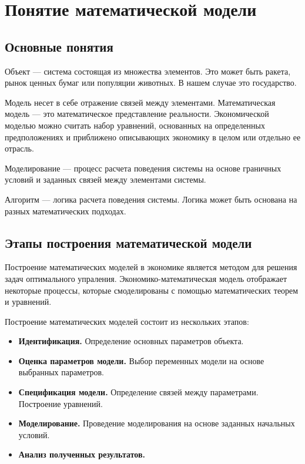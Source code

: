 \chapter{Понятие математической модели}
\label{cha:definition}

\section{Основные понятия}

Объект --- система состоящая из множества элементов.
Это может быть ракета, рынок ценных бумаг или популяции животных.
В нашем случае это государство.

Модель несет в себе отражение связей между элементами.
Математическая модель --- это математическое представление реальности.
Экономической моделью можно считать набор уравнений, основанных на определенных предположениях и приближено описывающих экономику в целом или отдельно ее отрасль.

Моделирование --- процесс расчета поведения системы на основе граничных условий и заданных связей между элементами системы.

Алгоритм --- логика расчета поведения системы.
Логика может быть основана на разных математических подходах.

\section{Этапы построения математической модели}

Построение математических моделей в экономике является методом для решения задач оптимального упраления.
Экономико-математическая модель отображает некоторые процессы, которые смоделированы с помощью математических теорем и уравнений.

Построение математических моделей состоит из нескольких этапов:
\begin{itemize}
	\item \textbf{Идентификация.}
	Определение основных параметров объекта.
	\item \textbf{Оценка параметров модели.}
	Выбор переменных модели на основе выбранных параметров.
	\item \textbf{Спецификация модели.}
	Определение связей между параметрами.
	Построение уравнений.
	\item \textbf{Моделирование.}
	Проведение моделирования на основе заданных начальных условий.
	\item \textbf{Анализ полученных результатов.}
\end{itemize}

